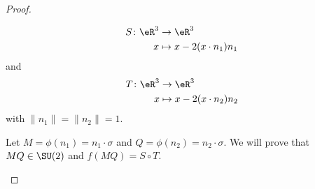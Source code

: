 \begin{proof}
\begin{subproof}
\begin{equation}
                \begin{aligned}
                    S\colon \eR^3&\to \eR^3 \\
                    x&\mapsto x-2(x\cdot n_1)n_1 
                \end{aligned}
            \end{equation}
            and
            \begin{equation}
                \begin{aligned}
                    T\colon \eR^3&\to \eR^3 \\
                    x&\mapsto x-2(x\cdot n_2)n_2 
                \end{aligned}
            \end{equation}
            with \( \| n_1 \|=\| n_2 \|=1\).
            
            Let \( M= \phi(n_1) =n_1\cdot \sigma\) and \( Q=\phi(n_2)=n_2\cdot \sigma\). We will prove that \( MQ\in \SU(2)\) and \( f(MQ)=S\circ T\).


\end{subproof}
\end{proof}
